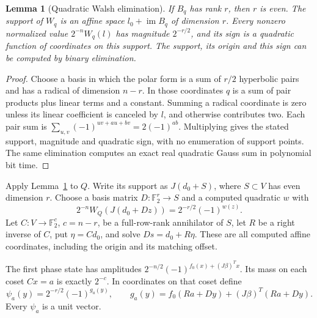 \documentclass[11pt]{article}
\newtheorem{lemma}[theorem]{Lemma}
\newcommand{\F}{\mathbb F_2}
\newcommand{\im}{\operatorname{im}}
\begin{document}
\begin{lemma}[Quadratic Walsh elimination]\label{lem:walsh}
If $B_q$ has rank $r$, then $r$ is even. The support of $W_q$ is an affine space
$l_0+\im B_q$ of dimension $r$. Every nonzero normalized value $2^{-n}W_q(l)$ has
magnitude $2^{-r/2}$, and its sign is a quadratic function of coordinates on this
support. The support, its origin and this sign can be computed by binary elimination.
\end{lemma}
\begin{proof}
Choose a basis in which the polar form is a sum of $r/2$ hyperbolic pairs and has a
radical of dimension $n-r$. In those coordinates $q$ is a sum of pair products plus
linear terms and a constant. Summing a radical coordinate is zero unless its linear
coefficient is canceled by $l$, and otherwise contributes two. Each pair sum is
$\sum_{u,v}(-1)^{uv+au+bv}=2(-1)^{ab}$. Multiplying gives the stated support,
magnitude and quadratic sign, with no enumeration of support points. The same
elimination computes an exact real quadratic Gauss sum in polynomial bit time.
\end{proof}

Apply Lemma~\ref{lem:walsh} to $Q$. Write its support as $J(d_0+S)$, where
$S\subset V$ has even dimension $r$. Choose a basis matrix $D:\F^r\to S$ and a
computed quadratic $w$ with
\begin{equation}\label{eq:walsh}
 2^{-n}W_Q(J(d_0+Dz))=2^{-r/2}(-1)^{w(z)}.
\end{equation}
Let $C:V\to\F^c$, $c=n-r$, be a full-row-rank annihilator of $S$, let $R$ be a
right inverse of $C$, put $\eta=Cd_0$, and solve $Ds=d_0+R\eta$. These are all
computed affine coordinates, including the origin and its matching offset.

The first phase state has amplitudes $2^{-n/2}(-1)^{f_0(x)+(J\beta)^Tx}$.
Its mass on each coset $Cx=a$ is exactly $2^{-c}$. In coordinates on that coset define
\begin{equation}\label{eq:psi}
 \psi_a(y)=2^{-r/2}(-1)^{g_a(y)},\qquad
 g_a(y)=f_0(Ra+Dy)+(J\beta)^T(Ra+Dy).
\end{equation}
Every $\psi_a$ is a unit vector.
\end{document}
